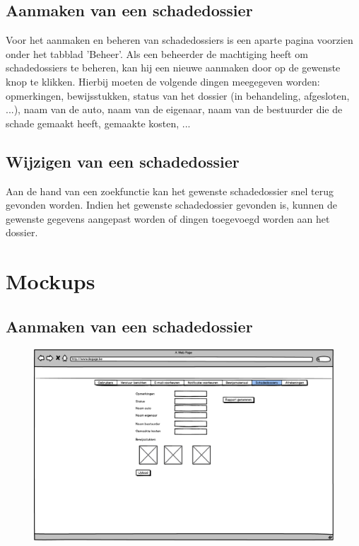\documentclass[11pt,a4paper,oneside]{article}
\begin{document}
\subsection{Aanmaken van een schadedossier}
Voor het aanmaken en beheren van schadedossiers is een aparte pagina voorzien onder het tabblad 'Beheer'. Als een beheerder de machtiging heeft om
schadedossiers te beheren, kan hij een nieuwe aanmaken door op de gewenste knop te klikken. Hierbij moeten de volgende dingen meegegeven worden:
opmerkingen, bewijsstukken, status van het dossier (in behandeling, afgesloten, ...), naam van de auto, naam van de eigenaar,
naam van de bestuurder die de schade gemaakt heeft, gemaakte kosten, ...

\subsection{Wijzigen van een schadedossier}
Aan de hand van een zoekfunctie kan het gewenste schadedossier snel terug gevonden worden. Indien het gewenste schadedossier gevonden is,
kunnen de gewenste gegevens aangepast worden of dingen toegevoegd worden aan het dossier.

\section{Mockups}
\subsection{Aanmaken van een schadedossier}
\begin{figure}[H]\includegraphics[width=\textwidth]{../../mockups/admin_schadedossiermaken.png}\end{figure}
\end{document}
